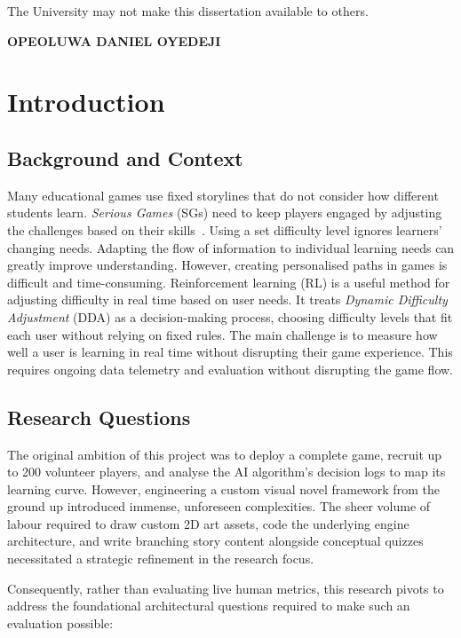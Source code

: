 \documentclass[12pt,a4paper]{report}
\begin{document}
The University may not make this dissertation available to others.

\textbf{OPEOLUWA DANIEL OYEDEJI}


\begingroup
	\singlespacing
	\hypersetup{linkcolor=black}
	\tableofcontents
	\listoffigures
\endgroup

\chapter{Introduction}

\section{Background and Context}

\quad Many educational games use fixed storylines that do not consider how different students learn. \textit{Serious Games} (SGs) need to keep players engaged by adjusting the challenges based on their skills~\cite{11}. Using a set difficulty level ignores learners' changing needs. Adapting the flow of information to individual learning needs can greatly improve understanding. However, creating personalised paths in games is difficult and time-consuming. Reinforcement learning (RL) is a useful method for adjusting difficulty in real time based on user needs. It treats \textit{Dynamic Difficulty Adjustment} (DDA) as a decision-making process, choosing difficulty levels that fit each user without relying on fixed rules. The main challenge is to measure how well a user is learning in real time without disrupting their game experience. This requires ongoing data telemetry and evaluation without disrupting the game flow.


\section{Research Questions}

\quad The original ambition of this project was to deploy a complete game, recruit up to 200 volunteer players, and analyse the AI algorithm's decision logs to map its learning curve. However, engineering a custom visual novel framework from the ground up introduced immense, unforeseen complexities. The sheer volume of labour required to draw custom 2D art assets, code the underlying engine architecture, and write branching story content alongside conceptual quizzes necessitated a strategic refinement in the research focus.

Consequently, rather than evaluating live human metrics, this research pivots to address the foundational architectural questions required to make such an evaluation possible:
\end{document}
